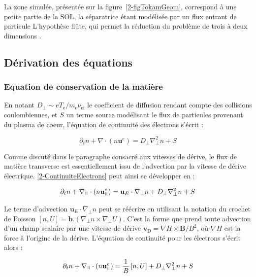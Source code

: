 \begin{refsection}
La zone simulée, présentée sur la figure~\ref{2-figTokamGeom}, correspond à une
petite partie de la SOL, la séparatrice étant modélisée par un flux entrant de
particule L'hypothèse flûte, qui permet la réduction du problème de trois à deux
dimensions .

\subsection{Dérivation des équations}
\subsubsection{Equation de conservation de la matière}
En notant $D_\perp\sim eT_\text{e}/m_\text{e}\nu_\text{ei}$ le coefficient de
diffusion rendant compte des collisions coulombiennes, et $S$ un terme source modélisant le flux de particules
provenant du plasma de coeur, l'équation de continuité des électrons s'écrit :

\begin{equation}
\label{2-ContinuiteElectrons}
\partial_t n + \nabla\cdot(n\mathbf{u}^e) = D_\perp\nabla^2_\perp n + S
\end{equation}

Comme discuté dans le paragraphe consacré aux vitesses de dérive, le flux de
matière transverse est essentiellement issu de l'advection par la vitesse de
dérive électrique. \eqref{2-ContinuiteElectrons} peut ainsi se
développer en :

\begin{equation}
\label{2-ContinuiteElectrons2}
\partial_t n + \nabla_\para\cdot(n\mathbf{u}^e_{\para}) =
\mathbf{u}_E\cdot\nabla_\perp n + D_\perp\nabla^2_\perp n + S
\end{equation}

Le terme d'advection $\mathbf{u}_E\cdot\nabla_\perp
n$ peut se réécrire en utilisant la notation
du crochet de Poisson $[n,U]=\mathbf{b}.(\nabla_\perp n\times\nabla_\perp U)$.
C'est la forme que prend toute advection d'un champ scalaire par une vitesse de
dérive $\mathbf{v}_\text{D}=\nabla H\times\mathbf{B}/B^2$, où $\nabla H$ est la
force à l'origine de la dérive. L'équation de continuité pour les électrons
s'écrit alors :

\begin{equation}
\label{2-eqContinuiteFinale}
\partial_t n + \nabla_{\para}\cdot(n\mathbf{u}^e_{\para}) =
\frac{1}{B}\left[n,U\right] + D_\perp\nabla^2_\perp n + S
\end{equation}


\end{refsection}
